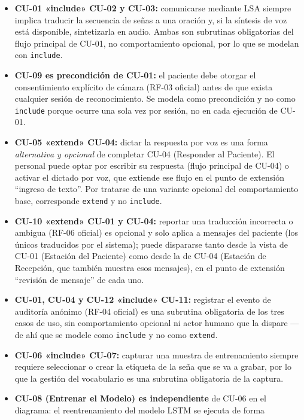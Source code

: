 \begin{itemize}
    \item \textbf{CU-01 «include» CU-02 y CU-03:} comunicarse mediante LSA
    siempre implica traducir la secuencia de señas a una oración y, si la
    síntesis de voz está disponible, sintetizarla en audio. Ambas son
    subrutinas obligatorias del flujo principal de CU-01, no
    comportamiento opcional, por lo que se modelan con \texttt{include}.
    \item \textbf{CU-09 es precondición de CU-01:} el paciente debe otorgar
    el consentimiento explícito de cámara (RF-03 oficial) antes de que
    exista cualquier sesión de
    reconocimiento. Se modela como precondición y no como \texttt{include}
    porque ocurre una sola vez por sesión, no en cada ejecución de CU-01.
    \item \textbf{CU-05 «extend» CU-04:} dictar la respuesta por voz es una
    forma \emph{alternativa y opcional} de completar CU-04 (Responder al
    Paciente). El personal puede optar por escribir su respuesta (flujo
    principal de CU-04) o activar el dictado por voz, que extiende ese flujo
    en el punto de extensión ``ingreso de texto''. Por tratarse de una
    variante opcional del comportamiento base, corresponde \texttt{extend}
    y no \texttt{include}.
    \item \textbf{CU-10 «extend» CU-01 y CU-04:} reportar una traducción
    incorrecta o ambigua (RF-06 oficial) es opcional y solo aplica a
    mensajes del paciente (los únicos traducidos por el sistema); puede
    dispararse tanto desde la vista de CU-01 (Estación del Paciente) como
    desde la de CU-04 (Estación de Recepción, que también muestra esos
    mensajes), en el punto de extensión ``revisión de mensaje'' de cada
    uno.
    \item \textbf{CU-01, CU-04 y CU-12 «include» CU-11:} registrar el evento de
    auditoría anónimo (RF-04 oficial) es una subrutina obligatoria de
    los tres casos de uso, sin
    comportamiento opcional ni actor humano que la dispare --- de ahí que se
    modele como \texttt{include} y no como \texttt{extend}.
    \item \textbf{CU-06 «include» CU-07:} capturar una muestra de
    entrenamiento siempre requiere seleccionar o crear la etiqueta de la
    seña que se va a grabar, por lo que la gestión del vocabulario es una
    subrutina obligatoria de la captura.
    \item \textbf{CU-08 (Entrenar el Modelo) es independiente} de CU-06 en el
    diagrama: el reentrenamiento del modelo LSTM se ejecuta de forma

\end{itemize}
